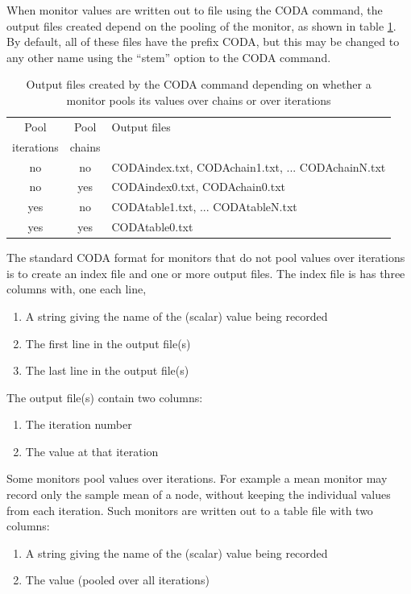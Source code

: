 \documentclass[11pt, a4paper, titlepage]{report}
\begin{document}
When monitor values are written out to file using the CODA command,
the output files created depend on the pooling of the monitor, as
shown in table \ref{table:coda}. By default, all of these files have
the prefix CODA, but this may be changed to any other name using the
``stem'' option to the CODA command.

\begin{table}[h]
\begin{tabular}{ccl}
\hline
Pool       & Pool   & Output files \\
iterations & chains &              \\
\hline
no         & no     & CODAindex.txt, CODAchain1.txt, ... 
                      CODAchainN.txt \\
no         & yes    & CODAindex0.txt, CODAchain0.txt \\
yes        & no     & CODAtable1.txt, ... CODAtableN.txt \\
yes        & yes    & CODAtable0.txt \\
\hline
\end{tabular}
\caption{Output files created by the CODA command depending on whether
a monitor pools its values over chains or over iterations \label{table:coda}}
\end{table}

The standard CODA format for monitors that do not pool values over
iterations is to create an index file and one or more output files.
The index file is has three columns with, one each line,
\begin{enumerate}
\item A string giving the name of the (scalar) value being recorded
\item The first line in the output file(s)
\item The last line in the output file(s)
\end{enumerate}
The output file(s) contain two columns:
\begin{enumerate}
\item The iteration number
\item The value at that iteration
\end{enumerate}

Some monitors pool values over iterations. For example a mean monitor
may record only the sample mean of a node, without keeping the
individual values from each iteration. Such monitors are written out
to a table file with two columns:
\begin{enumerate}
\item A string giving the name of the (scalar) value being recorded
\item The value (pooled over all iterations)
\end{enumerate}
\end{document}
